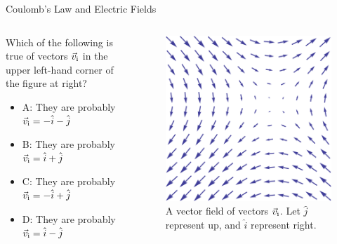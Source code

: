 \documentclass{beamer}
\begin{document}
\begin{frame}{Coulomb’s Law and Electric Fields}
\small
\begin{columns}[T]
\begin{column}{0.5\textwidth}
Which of the following is true of vectors $\vec{v}_{\rm i}$ in the upper left-hand corner of the figure at right?
\begin{itemize}
\item A: They are probably $\vec{v}_{\rm i} = -\hat{i}-\hat{j}$
\item B: They are probably $\vec{v}_{\rm i} = \hat{i}+\hat{j}$
\item C: They are probably $\vec{v}_{\rm i} = -\hat{i}+\hat{j}$
\item D: They are probably $\vec{v}_{\rm i} = \hat{i}-\hat{j}$
\end{itemize}
\end{column}
\begin{column}{0.5\textwidth}
\begin{figure}
\includegraphics[width=\textwidth]{figures/vectorField.png}
\caption{\label{fig:field2} A vector field of vectors $\vec{v}_{\rm i}$.  Let $\hat{j}$ represent up, and $\hat{i}$ represent right.}
\end{figure}
\end{column}
\end{columns}
\end{frame}
\end{document}
